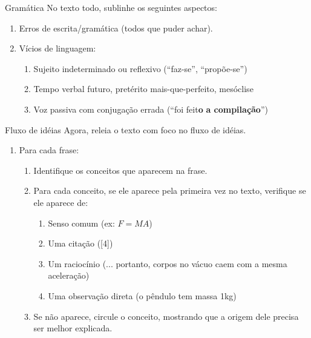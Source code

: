 \documentclass{beamer}
\begin{document}
\begin{frame}[fragile]{Gramática}
  \centering
  \large
  No texto todo, sublinhe os seguintes aspectos:
  \begin{enumerate}
    \item Erros de escrita/gramática (todos que puder achar).
    \item Vícios de linguagem:
      \begin{enumerate}
        \item Sujeito indeterminado ou reflexivo (``faz-se'', ``propõe-se'')
        \item Tempo verbal futuro, pretérito mais-que-perfeito, mesóclise
        \item Voz passiva com conjugação errada (``foi feit\textbf{o} \textbf{a
          compilação}'')
      \end{enumerate}
  \end{enumerate}
\end{frame}


\begin{frame}[fragile]{Fluxo de idéias}
  \centering
  \large
  Agora, releia o texto com foco no fluxo de idéias.
  \begin{enumerate}
    \item Para cada frase:
      \begin{enumerate}
        \item Identifique os conceitos que aparecem na frase.
        \item Para cada conceito, se ele aparece pela primeira vez no texto,
          verifique se ele aparece de:
          \begin{enumerate}
            \item Senso comum (ex: $F = MA$)
            \item Uma citação ([4])
            \item Um raciocínio (... portanto, corpos no vácuo caem com a mesma
              aceleração)
            \item Uma observação direta (o pêndulo tem massa 1kg)
          \end{enumerate}
        \item Se não aparece, circule o conceito, mostrando que a origem dele
          precisa ser melhor explicada.
       \end{enumerate}
   \end{enumerate}
\end{frame}
\end{document}
